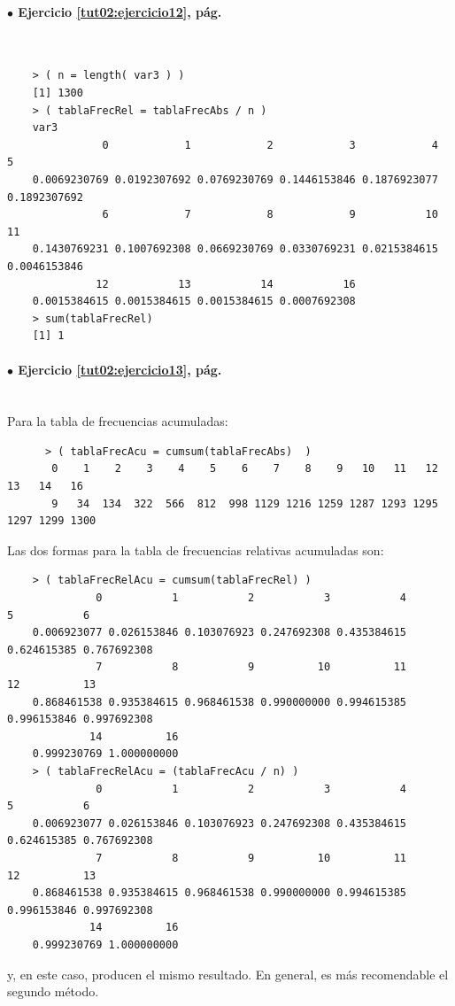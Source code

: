 \documentclass[10pt,a4paper]{article}\usepackage[]{graphicx}\usepackage[]{color}
\begin{document}
\paragraph{\bf $\bullet$ Ejercicio \ref{tut02:ejercicio12},  pág. \pageref{tut02:ejercicio12}}
\label{tut02:ejercicio12:sol}\quad\\
\begin{verbatim}
    > ( n = length( var3 ) )
    [1] 1300
    > ( tablaFrecRel = tablaFrecAbs / n )
    var3
               0            1            2            3            4            5
    0.0069230769 0.0192307692 0.0769230769 0.1446153846 0.1876923077 0.1892307692
               6            7            8            9           10           11
    0.1430769231 0.1007692308 0.0669230769 0.0330769231 0.0215384615 0.0046153846
              12           13           14           16
    0.0015384615 0.0015384615 0.0015384615 0.0007692308
    > sum(tablaFrecRel)
    [1] 1
\end{verbatim}

\paragraph{\bf $\bullet$ Ejercicio \ref{tut02:ejercicio13},  pág. \pageref{tut02:ejercicio13}}
\label{tut02:ejercicio13:sol}\quad\\

Para la tabla de frecuencias acumuladas:
\begin{verbatim}
      > ( tablaFrecAcu = cumsum(tablaFrecAbs)  )
       0    1    2    3    4    5    6    7    8    9   10   11   12   13   14   16
       9   34  134  322  566  812  998 1129 1216 1259 1287 1293 1295 1297 1299 1300
\end{verbatim}
Las dos formas para la tabla de frecuencias relativas acumuladas son:
\begin{verbatim}
    > ( tablaFrecRelAcu = cumsum(tablaFrecRel) )
              0           1           2           3           4           5           6
    0.006923077 0.026153846 0.103076923 0.247692308 0.435384615 0.624615385 0.767692308
              7           8           9          10          11          12          13
    0.868461538 0.935384615 0.968461538 0.990000000 0.994615385 0.996153846 0.997692308
             14          16
    0.999230769 1.000000000
    > ( tablaFrecRelAcu = (tablaFrecAcu / n) )
              0           1           2           3           4           5           6
    0.006923077 0.026153846 0.103076923 0.247692308 0.435384615 0.624615385 0.767692308
              7           8           9          10          11          12          13
    0.868461538 0.935384615 0.968461538 0.990000000 0.994615385 0.996153846 0.997692308
             14          16
    0.999230769 1.000000000
\end{verbatim}
y, en este caso,  producen el mismo resultado. En general, es más recomendable el segundo método.
\end{document}
